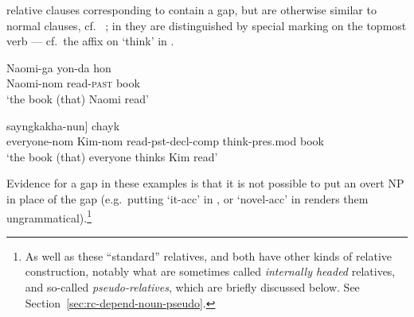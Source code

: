 \documentclass[output=paper,nonflat,draftmode]{./langsci/langscibook}
\begin{document}
relative clauses corresponding to  contain a gap, but are otherwise similar to
normal clauses, cf.\  \citep[from][18]{SiraiGunjiRelative}; in  they are
distinguished by special marking on the topmost verb --- cf.\ the  affix on
 `think' in 
\citep[from][285]{Kim16SyntacticStrKorean}.
\begin{exe}\ex\label{x:rc-81}
\gll Naomi-ga \uGap{} yon-da hon\\
     Naomi-{\sc nom} {} read-\textsc{past} book\\
\glt `the book (that) Naomi read'
\end{exe}
\begin{exe}\ex\label{x:rc-82}
 \gll [motwu-ka           [Kim-i       \uGap\subscr{i} ilk-ess-ta-ko]  sayngkakha-nun] chayk \\
      \hspaceThis{[}everyone-{\sc nom} \hspaceThis{[}Kim-{\sc nom}  {}     read-{\sc pst-decl-comp} think-{\sc pres.mod}   book\\
 \glt `the book (that) everyone thinks Kim read'  
\end{exe}
Evidence for a gap in these examples is that it is not possible to put an overt NP in
place of the gap (e.g.\ putting  `it-{\sc acc}' in , or
 `novel-{\sc acc}' in  renders them ungrammatical).\footnote{As
  well as these ``standard'' relatives,  and  both have other kinds of
  relative construction, notably what are sometimes called \emph{internally headed} relatives, and so-called
  \emph{pseudo-relatives}, which are briefly discussed below. See
  Section~\ref{sec:rc-depend-noun-pseudo}.}
\end{document}
